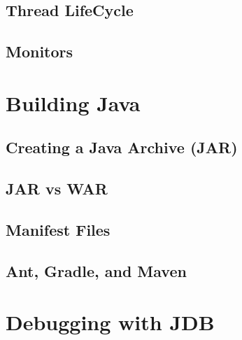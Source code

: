 \documentclass{article}
\begin{document}
\subsection{Thread LifeCycle}

\subsection{Monitors}

\section{Building Java}

\subsection{Creating a Java Archive (JAR)}

\subsection{JAR vs WAR}

\subsection{Manifest Files}

\subsection{Ant, Gradle, and Maven}

\section{Debugging with JDB}
\end{document}
